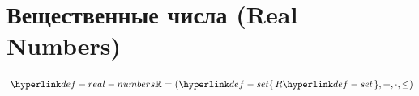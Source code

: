 
\section{Вещественные числа (Real Numbers)}

\hypertarget{def-real-numbers}{}
\begin{definition}
\label{entity:obj-real-numbers}


\[ \RealNumbers = (\Set{R}, +, \cdot, \leq) \]
\end{definition}